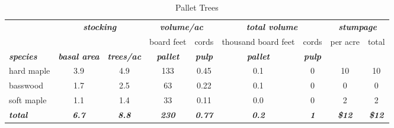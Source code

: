 \documentclass[landscape]{article}
\begin{document}
\begin{table}[H]

\caption{\label{tab:unnamed-chunk-62}Pallet Trees}
\fontsize{10}{12}\selectfont
\begin{tabular}[t]{lcccccccc}
\toprule
\multicolumn{1}{c}{\em{\textbf{ }}} & \multicolumn{2}{c}{\em{\textbf{stocking}}} & \multicolumn{2}{c}{\em{\textbf{volume/ac }}} & \multicolumn{2}{c}{\em{\textbf{total volume}}} & \multicolumn{2}{c}{\em{\textbf{stumpage}}} \\
\cmidrule(l{3pt}r{3pt}){2-3} \cmidrule(l{3pt}r{3pt}){4-5} \cmidrule(l{3pt}r{3pt}){6-7} \cmidrule(l{3pt}r{3pt}){8-9}
\multicolumn{3}{c}{ } & \multicolumn{1}{c}{board feet} & \multicolumn{1}{c}{cords} & \multicolumn{1}{c}{thousand board feet} & \multicolumn{1}{c}{cords} & \multicolumn{1}{c}{per acre} & \multicolumn{1}{c}{total} \\
\cmidrule(l{3pt}r{3pt}){4-4} \cmidrule(l{3pt}r{3pt}){5-5} \cmidrule(l{3pt}r{3pt}){6-6} \cmidrule(l{3pt}r{3pt}){7-7} \cmidrule(l{3pt}r{3pt}){8-8} \cmidrule(l{3pt}r{3pt}){9-9}
\rowcolor[HTML]{DCDCDC}  \em{\textbf{species}} & \em{\textbf{basal area}} & \em{\textbf{trees/ac}} & \em{\textbf{pallet}} & \em{\textbf{pulp}} & \em{\textbf{pallet}} & \em{\textbf{pulp}} & \em{\textbf{ }} & \em{\textbf{ }}\\
\midrule
\rowcolor{gray!6}  hard maple & 3.9 & 4.9 & 133 & 0.45 & 0.1 & 0 & 10 & 10\\
 
basswood & 1.7 & 2.5 & 63 & 0.22 & 0.1 & 0 & 0 & 0\\
 
\rowcolor{gray!6}  soft maple & 1.1 & 1.4 & 33 & 0.11 & 0.0 & 0 & 2 & 2\\
 
\rowcolor[HTML]{DCDCDC}  \em{\textbf{total}} & \em{\textbf{6.7}} & \em{\textbf{8.8}} & \em{\textbf{230}} & \em{\textbf{0.77}} & \em{\textbf{0.2}} & \em{\textbf{1}} & \em{\textbf{\$12}} & \em{\textbf{\$12}}\\
\bottomrule
\end{tabular}
\end{table}
\end{document}
